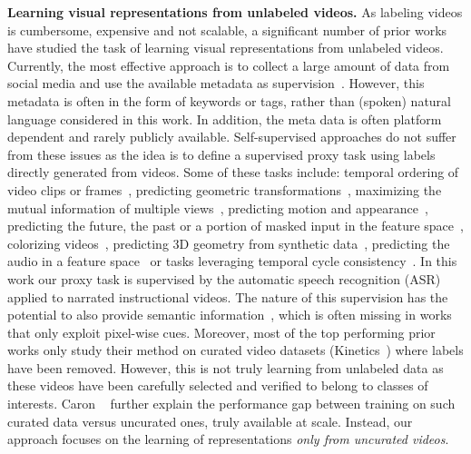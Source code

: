 \documentclass[10pt,twocolumn,letterpaper]{article}
\begin{document}
\noindent
\textbf{Learning visual representations from unlabeled videos.}
As labeling videos is cumbersome, expensive and not scalable, a significant number of prior works have
studied the task of learning visual representations from unlabeled videos.
Currently, the most effective approach is to collect a large amount of data from social media and use the available metadata as supervision~\cite{youtube8m,ghadiyaram2019large}.
However, this metadata is often in the form of keywords or tags, rather than (spoken) natural language considered in this work. In addition, the meta data is often platform dependent and rarely publicly available.
Self-supervised approaches do not suffer from these issues as the idea is to define a supervised proxy task using labels directly generated from videos.
Some of these tasks include: temporal ordering of video clips or frames~\cite{fernando2017self, lee2017unsupervised,misra2016shuffle,xu2019self},
predicting geometric transformations~\cite{jing2018self}, maximizing the mutual information of multiple views~\cite{tian2019contrastive}, predicting motion and appearance~\cite{wang2019self}, predicting the future, the past or a portion of masked input in the feature space~\cite{han2019video, sun2019contrastive, vondrick2016anticipating}, colorizing videos~\cite{vondrick2018tracking}, predicting 3D geometry from synthetic data~\cite{gan2018geometry}, predicting the audio in a feature space~\cite{arandjelovic2018objects,korbar2018cooperative} or tasks leveraging temporal cycle consistency~\cite{dwibedi2019temporal,wang2015unsupervised}.
In this work our proxy task is supervised by the automatic speech recognition (ASR) applied to narrated instructional videos.
The nature of this supervision has the potential to also provide semantic information~\cite{miech19howto100m,sanabria18how2}, which is often missing in works that only exploit pixel-wise cues.
Moreover, most of the top performing prior works only study their method on curated video datasets (\eg Kinetics~\cite{carreira2017quovadis}) where labels have been removed.
However, this is not truly learning from unlabeled data as these videos have been carefully selected and verified to belong to classes of interests.
Caron \etal~\cite{caron2019unsupervised} further explain the performance gap between training on such curated data versus uncurated ones, truly available at scale.
Instead, our approach focuses on the learning of representations \emph{only from uncurated videos}.
\end{document}
